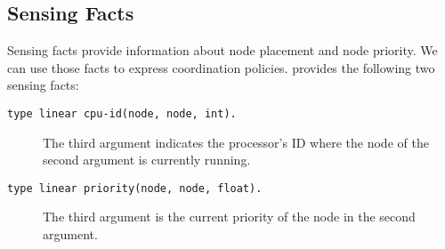 \subsection{Sensing Facts}

Sensing facts provide information about node placement and node priority. We can use those facts
to express coordination policies. \lang provides the following two
sensing facts:

\begin{description}
   \item[\texttt{type linear cpu-id(node, node, int).}] The third argument indicates the processor's ID where the node of the second argument is currently running.
   \item[\texttt{type linear priority(node, node, float).}] The third argument is the current priority of the node in the second argument.
\end{description}
